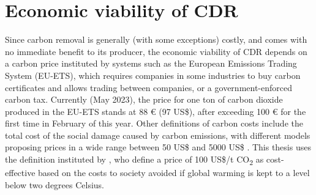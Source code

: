 \section{Economic viability of CDR}
Since carbon removal is generally (with some exceptions) costly, and comes with no immediate benefit to its producer, the economic viability of CDR depends on a carbon price instituted by systems such as the European Emissions Trading System (EU-ETS), which requires companies in some industries to buy carbon certificates and allows trading between companies, or a government-enforced carbon tax. Currently (May 2023), the price for one ton of carbon dioxide produced in the EU-ETS stands at 88 € (97 US\$), after exceeding 100 € for the first time in February of this year. Other definitions of carbon costs include the total cost of the social damage caused by carbon emissions, with different models proposing prices in a wide range between 50 US\$ and 5000 US\$ \parencite[1,7]{Kikstra2021TheVariability}. This thesis uses the definition instituted by \textcite[3]{Griscom2017NaturalSolutions}, who define a price of 100 US\$/t CO\textsubscript{2} as cost-effective based on the costs to society avoided if global warming is kept to a level below two degrees Celsius.